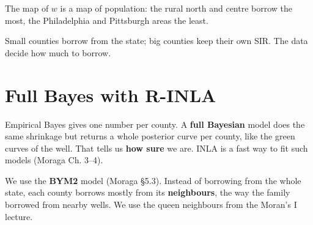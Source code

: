 \documentclass[
  letterpaper,
  DIV=11,
  numbers=noendperiod]{scrartcl}
\begin{document}
The map of \(w\) is a map of population: the rural north and centre
borrow the most, the Philadelphia and Pittsburgh areas the least.

\begin{tcolorbox}[enhanced jigsaw, colbacktitle=quarto-callout-tip-color!10!white, leftrule=.75mm, colframe=quarto-callout-tip-color-frame, bottomrule=.15mm, left=2mm, titlerule=0mm, title=\textcolor{quarto-callout-tip-color}{\faLightbulb}\hspace{0.5em}{Key idea}, rightrule=.15mm, bottomtitle=1mm, colback=white, toptitle=1mm, coltitle=black, arc=.35mm, breakable, toprule=.15mm, opacitybacktitle=0.6, opacityback=0]

Small counties borrow from the state; big counties keep their own SIR.
The data decide how much to borrow.

\end{tcolorbox}

\section{Full Bayes with R-INLA}\label{full-bayes-with-r-inla}

Empirical Bayes gives one number per county. A \textbf{full Bayesian}
model does the same shrinkage but returns a whole posterior curve per
county, like the green curves of the well. That tells us \textbf{how
sure} we are. INLA is a fast way to fit such models (Moraga Ch. 3--4).

We use the \textbf{BYM2} model (Moraga §5.3). Instead of borrowing from
the whole state, each county borrows mostly from its
\textbf{neighbours}, the way the family borrowed from nearby wells. We
use the queen neighbours from the Moran's I lecture.
\end{document}

